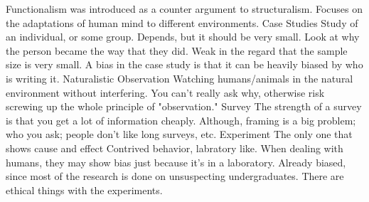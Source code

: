 \markdownRendererUlItem Functionalism was introduced as a counter argument to structuralism.\markdownRendererInterblockSeparator
{}\markdownRendererUlBeginTight
\markdownRendererUlItem Focuses on the adaptations of human mind to different environments.\markdownRendererUlItemEnd 
\markdownRendererUlEndTight \markdownRendererUlItemEnd 
\markdownRendererUlEndTight \markdownRendererInterblockSeparator
{}\markdownRendererInterblockSeparator
{}\markdownRendererUlBeginTight
\markdownRendererUlItem Case Studies\markdownRendererInterblockSeparator
{}\markdownRendererUlBeginTight
\markdownRendererUlItem Study of an individual, or some group. Depends, but it should be very small.\markdownRendererUlItemEnd 
\markdownRendererUlItem Look at why the person became the way that they did.\markdownRendererUlItemEnd 
\markdownRendererUlItem Weak in the regard that the sample size is very small.\markdownRendererUlItemEnd 
\markdownRendererUlItem A bias in the case study is that it can be heavily biased by who is writing it.\markdownRendererUlItemEnd 
\markdownRendererUlEndTight \markdownRendererUlItemEnd 
\markdownRendererUlItem Naturalistic Observation\markdownRendererInterblockSeparator
{}\markdownRendererUlBeginTight
\markdownRendererUlItem Watching humans/animals in the natural environment without interfering.\markdownRendererUlItemEnd 
\markdownRendererUlItem You can't really ask why, otherwise risk screwing up the whole principle of "observation."\markdownRendererUlItemEnd 
\markdownRendererUlEndTight \markdownRendererUlItemEnd 
\markdownRendererUlItem Survey\markdownRendererInterblockSeparator
{}\markdownRendererUlBeginTight
\markdownRendererUlItem The strength of a survey is that you get a lot of information cheaply. Although, framing is a big problem; who you ask; people don't like long surveys, etc.\markdownRendererUlItemEnd 
\markdownRendererUlEndTight \markdownRendererUlItemEnd 
\markdownRendererUlItem Experiment\markdownRendererInterblockSeparator
{}\markdownRendererUlBeginTight
\markdownRendererUlItem The only one that shows cause and effect\markdownRendererUlItemEnd 
\markdownRendererUlItem Contrived behavior, labratory like.\markdownRendererUlItemEnd 
\markdownRendererUlItem When dealing with humans, they may show bias just because it's in a laboratory.\markdownRendererUlItemEnd 
\markdownRendererUlItem Already biased, since most of the research is done on unsuspecting undergraduates.\markdownRendererUlItemEnd 
\markdownRendererUlItem There are ethical things with the experiments.\markdownRendererUlItemEnd 
\markdownRendererUlEndTight \markdownRendererUlItemEnd 
